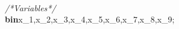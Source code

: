\documentclass[a4paper, 10pt]{article}
\newcommand\SPC{\hspace*{0.6em}}
\newcommand{\LPHighlighterAComment}[1]{\textit{\textcolor[rgb]{0,0.5,0}{#1}}}
\newcommand{\LPHighlighterAIdentifier}[1]{#1}
\newcommand{\LPHighlighterAReservedWord}[1]{\textbf{#1}}
\newcommand{\LPHighlighterASpace}[1]{#1}
\newcommand{\LPHighlighterASymbol}[1]{#1}
\begin{document}
\begin{ttfamily}
\\
\LPHighlighterAComment{/*\SPC Variables\SPC */}\\
\LPHighlighterAReservedWord{bin}\LPHighlighterASpace{\SPC }\LPHighlighterAIdentifier{x\_1}\LPHighlighterASymbol{,}\LPHighlighterAIdentifier{x\_2}\LPHighlighterASymbol{,}\LPHighlighterAIdentifier{x\_3}\LPHighlighterASymbol{,}\LPHighlighterAIdentifier{x\_4}\LPHighlighterASymbol{,}\LPHighlighterAIdentifier{x\_5}\LPHighlighterASymbol{,}\LPHighlighterAIdentifier{x\_6}\LPHighlighterASymbol{,}\LPHighlighterAIdentifier{x\_7}\LPHighlighterASymbol{,}\LPHighlighterAIdentifier{x\_8}\LPHighlighterASymbol{,}\LPHighlighterAIdentifier{x\_9}\LPHighlighterASymbol{;}\\

\end{ttfamily}
\end{document}
